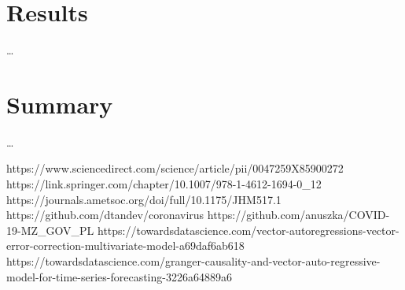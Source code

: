 \documentclass[conference]{IEEEtran}
\begin{document}
\section{Results}
\dots

\section{Summary}
\dots


\begin{thebibliography}{00}
 https://www.sciencedirect.com/science/article/pii/0047259X85900272
 https://link.springer.com/chapter/10.1007/978-1-4612-1694-0\_12
 https://journals.ametsoc.org/doi/full/10.1175/JHM517.1
 https://github.com/dtandev/coronavirus
 https://github.com/anuszka/COVID-19-MZ_GOV_PL
 https://towardsdatascience.com/vector-autoregressions-vector-error-correction-multivariate-model-a69daf6ab618
 https://towardsdatascience.com/granger-causality-and-vector-auto-regressive-model-for-time-series-forecasting-3226a64889a6
\end{thebibliography}
\vspace{12pt}
\end{document}
